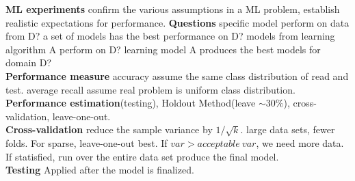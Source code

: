 \documentclass[cheatsheet.tex]{subfiles}
\begin{document}
\textbf{ML experiments} confirm the various assumptions in a ML problem, establish realistic expectations for performance. \textbf{Questions} specific model perform on data from D? a set of models has the best performance on D? models from learning algorithm A perform on D? learning model A produces the best models for domain D?\\

\textbf{Performance measure} accuracy assume the same class distribution of read and test. average recall assume real problem is uniform class distribution.\\

\textbf{Performance estimation}(testing), Holdout Method(leave $\sim30\%$), cross-validation, leave-one-out.\\

\textbf{Cross-validation} reduce the sample variance by $1/\sqrt{k}$. large data sets, fewer folds. For sparse, leave-one-out best. If $var>acceptable\ var$, we need more data. If statisfied, run over the entire data set produce the final model. \\

\textbf{Testing} Applied after the model is finalized. 
\end{document}
